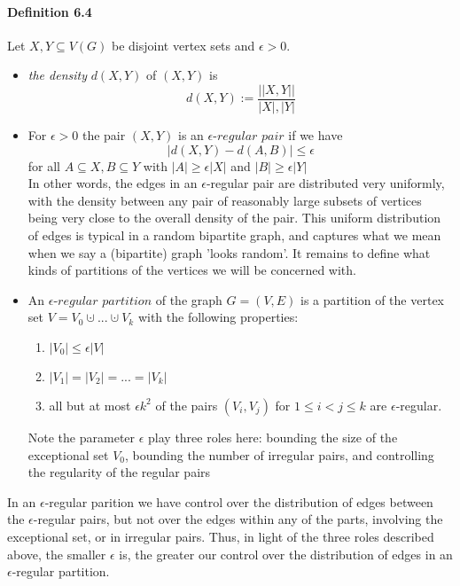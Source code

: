 \paragraph{Definition 6.4} Let $ X,Y \subseteq V(G) $ be disjoint
vertex sets and $ \epsilon > 0 $. 
\begin{itemize}
    \item \textit{the density} $d(X,Y)$ of $(X,Y)$ is 
    $$ d(X,Y) := \frac{||X,Y||}{|X|,|Y|} $$ 
    \item For $ \epsilon > 0 $ the pair $ (X,Y)$ is an $\epsilon$-$regular$ $pair$
    if we have 
    $$ |d(X,Y) - d(A,B)| \leq \epsilon $$ 
    for all $ A \subseteq X, B \subseteq Y $ with 
    $|A| \geq \epsilon|X| $ and $ |B| \geq \epsilon|Y| $ \\
    In other words, the edges in an $\epsilon$-regular pair are distributed
    very uniformly, with the density between any pair of reasonably large 
    subsets of vertices being very close to the overall density of the pair.
    This uniform distribution of edges is typical in a random bipartite graph,
    and captures what we mean when we say a (bipartite) graph 'looks random'.
    It remains to define what kinds of partitions of the vertices we will 
    be concerned with.
    \item An $\epsilon$-$regular$ $partition$ of the graph $ G = (V,E) $ is 
    a partition of the vertex set $ V  = V_0 \cupdot ... \cupdot V_k $ with 
    the following properties:
        \begin{enumerate}
            \item $|V_0| \leq \epsilon|V| $
            \item $ |V_1| = |V_2| = ... = |V_k| $
            \item all but at most $ \epsilon k^2$ of the pairs $ (V_i,V_j) $
            for $ 1 \leq i < j \leq k $ are $\epsilon$-regular.
        \end{enumerate}
    Note the parameter $\epsilon$ play three roles here: bounding the size of 
    the exceptional set $ V_0 $, bounding the number of irregular pairs, and 
    controlling the regularity of the regular pairs
\end{itemize}
In an $\epsilon$-regular parition we have control over the distribution of edges 
between the $\epsilon$-regular pairs, but not over the edges within any of the 
parts, involving the exceptional set, or in irregular pairs. Thus, in light of 
the three roles described above, the smaller $\epsilon$ is, the greater our 
control over the distribution of edges in an $\epsilon$-regular partition.

